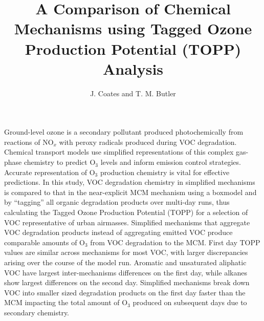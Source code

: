 \documentclass{article}
\begin{document}
\title{A Comparison of Chemical Mechanisms using Tagged Ozone Production Potential (TOPP) Analysis}
\author{J. Coates and T. M. Butler}

\maketitle

Ground-level ozone is a secondary pollutant produced photochemically from reactions of NO$_x$ with peroxy radicals produced during VOC degradation. 
Chemical transport models use simplified representations of this complex gas-phase chemistry to predict O$_3$ levels and inform emission control strategies. 
Accurate representation of O$_3$ production chemistry is vital for effective predictions.
In this study, VOC degradation chemistry in simplified mechanisms is compared to that in the near-explicit MCM mechanism using a boxmodel and by ``tagging'' all organic degradation products over multi-day runs, thus calculating the Tagged Ozone Production Potential (TOPP) for a selection of VOC representative of urban airmasses.
Simplified mechanisms that aggregate VOC degradation products instead of aggregating emitted VOC produce comparable amounts of O$_3$ from VOC degradation to the MCM.
First day TOPP values are similar across mechanisms for most VOC, with larger discrepancies arising over the course of the model run.
Aromatic and unsaturated aliphatic VOC have largest inter-mechanisms differences on the first day, while alkanes show largest differences on the second day.
Simplified mechanisms break down VOC into smaller sized degradation products on the first day faster than the MCM impacting the total amount of O$_3$ produced on subsequent days due to secondary chemistry.
\end{document}
